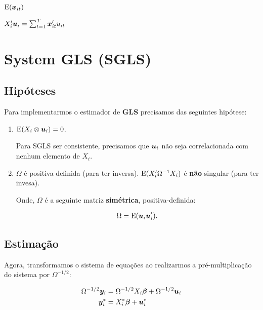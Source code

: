 \documentclass[11pt, oneside, a4paper, article]{article}
\numberwithin{equation}{section}
\begin{document}
$\text{E}(\boldsymbol{x}_{it})$

$X_{i}' \boldsymbol{u}_{i} = \sum_{t=1}^{T} \boldsymbol{x}_{it}' u_{it}$




\clearpage
\section{System GLS (SGLS)}

\noindent
\citet[Sec.7.4 -- Consistency and Asymptotic Normality of Generalized Least Squares, p.153]{wool-2010} 

\subsection*{Hipóteses}

Para implementarmos o estimador de \textbf{GLS} precisamos das seguintes hipótese:

\begin{enumerate}
\item %

$\text{E}(X_{i} \otimes \boldsymbol{u}_{i}) = 0$.

Para SGLS ser consistente, precisamos que $\boldsymbol{u}_{i}$ não seja correlacionada com nenhum elemento de $X_{i}$.

\item %

$\Omega$ é positiva definida (para ter inversa).
$\text{E}(X_{i}^{\prime} \Omega^{-1} X_{i})$ é \textbf{não} singular (para ter invesa).

Onde, $\Omega$ é a seguinte matriz \textbf{simétrica}, positiva-definida:

\vspace{-1.5 em}
\begin{align*}
\Omega = \text{E}(\boldsymbol{u}_{i} \boldsymbol{u}_{i}^{\prime}).
\end{align*}
\end{enumerate}

\subsection*{Estimação}

Agora, transformamos o sistema de equações ao realizarmos a pré-multiplicação do sistema por $\Omega^{-1/2}$:

\vspace{-1.5 em}
\begin{align*}
\Omega^{-1/2} \boldsymbol{y}_{i} 
&=
\Omega^{-1/2} X_{i} \boldsymbol{\beta}
+
\Omega^{-1/2} \boldsymbol{u}_{i}
\\
\boldsymbol{y}_{i}^{*}
&=
X_{i}^{*} \boldsymbol{\beta}
+
\boldsymbol{u}^{*}_{i}
\end{align*}
\end{document}

